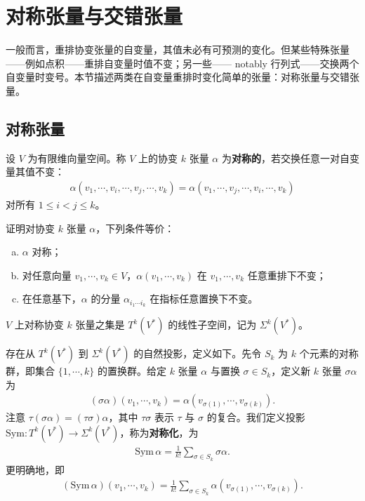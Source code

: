 \documentclass[../../main.tex]{subfiles}
\begin{document}
\section{对称张量与交错张量}\label{section:ch12-对称与交错张量}

一般而言，重排协变张量的自变量，其值未必有可预测的变化。但某些特殊张量——例如点积——重排自变量时值不变；另一些—— notably 行列式——交换两个自变量时变号。本节描述两类在自变量重排时变化简单的张量：对称张量与交错张量。

\subsection*{对称张量}

设 $V$ 为有限维向量空间。称 $V$ 上的协变 $k$ 张量 $\alpha$ 为\textbf{对称的}，若交换任意一对自变量其值不变：
\begin{align*}
\alpha(v_1,\cdots ,v_i,\cdots ,v_j,\cdots ,v_k)=\alpha(v_1,\cdots ,v_j,\cdots ,v_i,\cdots ,v_k)
\end{align*}
对所有 $1\leqslant i<j\leqslant k$。

\begin{exercise}\label{exercise:ch12-13}
证明对协变 $k$ 张量 $\alpha$，下列条件等价：
\begin{enumerate}[(a)]
\item $\alpha$ 对称；
\item 对任意向量 $v_1,\cdots ,v_k\in V$，$\alpha(v_1,\cdots ,v_k)$ 在 $v_1,\cdots ,v_k$ 任意重排下不变；
\item 在任意基下，$\alpha$ 的分量 $\alpha_{i_1\cdots  i_k}$ 在指标任意置换下不变。
\end{enumerate}
\end{exercise}

$V$ 上对称协变 $k$ 张量之集是 $T^k(V^*)$ 的线性子空间，记为 $\Sigma^k(V^*)$。

存在从 $T^k(V^*)$ 到 $\Sigma^k(V^*)$ 的自然投影，定义如下。先令 $S_k$ 为 $k$ 个元素的对称群，即集合 $\{1,\cdots ,k\}$ 的置换群。给定 $k$ 张量 $\alpha$ 与置换 $\sigma\in S_k$，定义新 $k$ 张量 $\sigma\alpha$ 为
\begin{align*}
(\sigma\alpha)(v_1,\cdots ,v_k)=\alpha(v_{\sigma(1)},\cdots ,v_{\sigma(k)}).
\end{align*}
注意 $\tau(\sigma\alpha)=(\tau\sigma)\alpha$，其中 $\tau\sigma$ 表示 $\tau$ 与 $\sigma$ 的复合。我们定义投影 $\mathrm{Sym}\colon T^k(V^*)\to\Sigma^k(V^*)$，称为\textbf{对称化}，为
\begin{align}
\mathrm{Sym}\,\alpha=\frac{1}{k!}\sum_{\sigma\in S_k}\sigma\alpha.\label{align:ch12-对称化定义}
\end{align}
更明确地，即
\begin{align*}
(\mathrm{Sym}\,\alpha)(v_1,\cdots ,v_k)=\frac{1}{k!}\sum_{\sigma\in S_k}\alpha(v_{\sigma(1)},\cdots ,v_{\sigma(k)}).
\end{align*}
\end{document}
